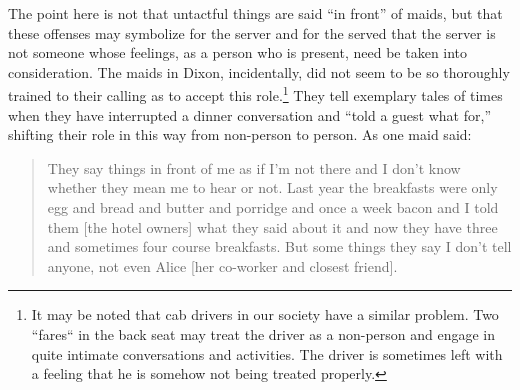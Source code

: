 \documentclass[twoside,symmetric,nobib,justified]{tufte-book}
\begin{document}
\noindent The point here is not that untactful things are said ``in front'' of
maids, but that these offenses may symbolize for the server and for the
served that the server is not someone whose feelings, as a person who is
present, need be taken into consideration. The maids in Dixon,
incidentally, did not seem to be so thoroughly trained to their calling
as to accept this role.\footnote{It may be noted that cab drivers in our
  society have a similar problem. Two ``fares`` in the back seat may
  treat the driver as a non-person and engage in quite intimate
  conversations and activities. The driver is sometimes left with a
  feeling that he is somehow not being treated properly.} They tell
exemplary tales of times when they have interrupted a dinner
conversation and ``told a guest what for,'' shifting their role in this
way from non-person to person. As one maid said:

\begin{quote}
They say things in front of me as if I'm not there and I don't know
whether they mean me to hear or not. Last year the breakfasts were only
egg and bread and butter and porridge and once a week bacon and I told
them {[}the hotel owners{]} what they said about it and now they have
three and sometimes four course breakfasts. But some things they say I
don't tell anyone, not even Alice {[}her co-worker and closest
friend{]}.
\end{quote}
\end{document}
